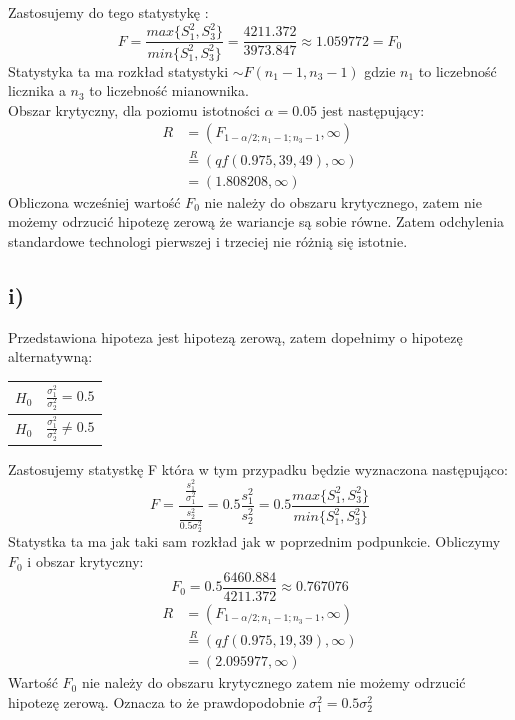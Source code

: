 \documentclass{article}
\begin{document}
Zastosujemy do tego statystykę : 
\[ F = \frac{max\{S^2_1, S^2_3\}}{min\{S^2_1, S^2_3\}} = \frac{4211.372}{3973.847} \approx 1.059772 = F_0 \]
Statystyka ta ma rozkład statystyki $\sim F(n_1-1, n_3-1)$ gdzie $n_1$ to liczebność licznika a $n_3$ to liczebność mianownika. \\
Obszar krytyczny, dla poziomu istotności $\alpha = 0.05$ jest następujący:
\begin{align*}
R &= (F_{1 - \alpha/2; n_1-1; n_3-1}, \infty ) \\
& \overset{R}{=} (qf(0.975, 39, 49), \infty ) \\
& = ( 1.808208, \infty)
\end{align*}
Obliczona wcześniej wartość $F_0$ nie należy do obszaru krytycznego, zatem nie możemy odrzucić hipotezę zerową że wariancje są sobie równe. Zatem odchylenia standardowe technologi pierwszej i trzeciej nie różnią się istotnie.

\subsection{i)}
Przedstawiona hipoteza jest hipotezą zerową, zatem dopełnimy o hipotezę alternatywną:
\begin{center} \begin{tabular}{|c|c|} \hline
$H_0$ & $\frac{\sigma^2_1}{\sigma^2_2} = 0.5$ \\ \hline
$H_0$ & $\frac{\sigma^2_1}{\sigma^2_2} \neq 0.5$ \\ \hline
\end{tabular} \end{center}

Zastosujemy statystkę F która w tym przypadku będzie wyznaczona następująco:
\[ F = \frac{\frac{s_1^2}{\sigma_1^2}}{\frac{s_2^2}{0.5\sigma_2^2}} = 0.5 \frac{s_1^2}{s_2^2} = 0.5  \frac{max\{S^2_1, S^2_3\}}{min\{S^2_1, S^2_3\}} \]
Statystka ta ma jak taki sam rozkład jak w poprzednim podpunkcie. Obliczymy $F_0$ i obszar krytyczny:
\[ F_0 = 0.5 \frac{6460.884}{4211.372} \approx 0.767076 \]
\begin{align*}
R & = (F_{1 - \alpha/2; n_1-1; n_3-1}, \infty ) \\
& \overset{R}{=} (qf(0.975, 19, 39), \infty ) \\
& = ( 2.095977, \infty)
\end{align*}
Wartość $F_0$ nie należy do obszaru krytycznego zatem nie możemy odrzucić hipotezę zerową. Oznacza to że prawdopodobnie $\sigma^2_1 = 0.5 \sigma^2_2$
\end{document}
